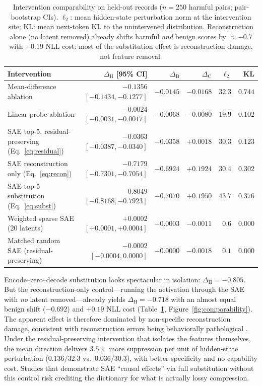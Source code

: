 \documentclass[11pt]{article}
\newcommand{\dH}{\ensuremath{\Delta_{\mathrm{H}}}}
\newcommand{\dB}{\ensuremath{\Delta_{\mathrm{B}}}}
\newcommand{\dC}{\ensuremath{\Delta_{\mathrm{C}}}}
\begin{document}
\begin{table}[t]
\centering
\small
\begin{tabular}{@{}lrrrrr@{}}
\toprule
Intervention & \dH{} [95\% CI] & \dB{} & \dC{} & $\ell_2$ & KL \\
\midrule
Mean-difference ablation & $-0.1356$ $[-0.1434,-0.1277]$ & $-0.0145$ & $-0.0168$ & $32.3$ & $0.744$ \\
Linear-probe ablation & $-0.0024$ $[-0.0031,-0.0017]$ & $-0.0068$ & $-0.0080$ & $19.9$ & $0.102$ \\
SAE top-5, residual-preserving (Eq.~\ref{eq:residual}) & $-0.0363$ $[-0.0387,-0.0340]$ & $-0.0358$ & $+0.0018$ & $30.3$ & $0.123$ \\
SAE reconstruction only (Eq.~\ref{eq:recon}) & $-0.7179$ $[-0.7301,-0.7054]$ & $-0.6924$ & $+0.1924$ & $30.4$ & $0.302$ \\
SAE top-5 substitution (Eq.~\ref{eq:subst}) & $-0.8049$ $[-0.8168,-0.7923]$ & $-0.7070$ & $+0.1950$ & $43.7$ & $0.376$ \\
Weighted sparse SAE (20 latents) & $+0.0002$ $[+0.0001,+0.0004]$ & $-0.0003$ & $-0.0011$ & $0.6$ & $0.000$ \\
Matched random SAE (residual-preserving) & $-0.0002$ $[-0.0004,0.0000]$ & $-0.0000$ & $-0.0018$ & $0.1$ & $0.000$ \\
\bottomrule
\end{tabular}
\caption{Intervention comparability on held-out records ($n=250$ harmful
pairs; pair-bootstrap CIs).  $\ell_2$: mean hidden-state perturbation norm at
the intervention site; KL: mean next-token KL to the unintervened
distribution.  Reconstruction alone (no latent removed) already shifts
harmful \emph{and} benign scores by $\approx-0.7$ with $+0.19$ NLL cost:
most of the substitution effect is reconstruction damage, not feature
removal.}
\label{tab:comparability}
\end{table}

Encode--zero--decode substitution looks spectacular in isolation:
$\dH=-0.805$.  But the reconstruction-only control---running the activation
through the SAE with \emph{no} latent removed---already yields $\dH=-0.718$
with an almost equal benign shift ($-0.692$) and $+0.19$ NLL cost
(Table~\ref{tab:comparability}, Figure~\ref{fig:comparability}).  The
apparent effect is therefore dominated by non-specific reconstruction damage,
consistent with reconstruction errors being behaviorally pathological
\citep{gurnee2024sae}.  Under the residual-preserving intervention that
isolates the features themselves, the mean direction delivers $3.5\times$
more suppression per unit of hidden-state perturbation ($0.136/32.3$ vs.\
$0.036/30.3$), with better specificity and no capability cost.  Studies that
demonstrate SAE ``causal effects'' via full substitution without this control
risk crediting the dictionary for what is actually lossy compression.
\end{document}
